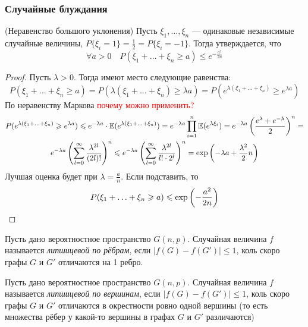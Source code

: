 \subsubsection{Случайные блуждания}

\begin{theorem} (Неравенство большого уклонения)
	Пусть $\xi_1, \ldots, \xi_n$ --- одинаковые независимые случайные величины, $P\{\xi_i = 1\} = \frac{1}{2} = P\{\xi_i = -1\}$. Тогда утверждается, что
	\[
		\forall a > 0 \quad P(\xi_1 + \ldots + \xi_n \ge a) \le e^{-\frac{a^2}{2n}}
	\]
\end{theorem}

\begin{proof}
	Пусть $\lambda > 0$. Тогда имеют место следующие равенства:
	\[
		P(\xi_1 + \ldots + \xi_n \ge a) = P(\lambda(\xi_1 + \ldots + \xi_n) \ge \lambda a) = P(e^{\lambda (\xi_1 + \ldots + \xi_n)} \ge e^{\lambda a})
	\]
	По неравенству Маркова \textcolor{red}{почему можно применить?}
	\begin{multline*}
		P(e^{\lambda (\xi_1 + \ldots + \xi_n)} \geqslant e^{\lambda a}) \leqslant e^{-\lambda a} \cdot \mathbb{E}(e^{\lambda(\xi_1 + \ldots + \xi_n)}) = e^{-\lambda a} \prod_{i = 1}^n \mathbb{E}(e^{\lambda \xi_i}) = e^{-\lambda a} \left(\frac{e^\lambda + e^{-\lambda}}{2}\right)^n =
		\\
		e^{-\lambda a} \left(\sum_{l = 0}^\infty \frac{\lambda^{2l}}{(2l)!}\right)^n \leqslant e^{-\lambda a} \left(\sum_{l = 0}^\infty \frac{\lambda^{2l}}{l! \cdot 2^l}\right)^n = \exp\left(-\lambda a + \frac{\lambda^2}{2}n\right)
	\end{multline*}
	Лучшая оценка будет при $\lambda = \frac{a}{n}$. Если подставить, то
	\[
		P(\xi_1 + \ldots + \xi_n \geqslant a) \leqslant \exp\left(-\frac{a^2}{2n}\right)
	\]
\end{proof}

\begin{definition}
	Пусть дано вероятностное пространство $G(n, p)$. Случайная величина $f$ называется \textit{липшицевой по рёбрам}, если $|f(G) - f(G')| \le 1$, коль скоро графы $G$ и $G'$ отличаются на 1 ребро.
\end{definition}

\begin{definition}
	Пусть дано вероятностное пространство $G(n, p)$. Случайная величина $f$ называется \textit{липшицевой по вершинам}, если $|f(G) - f(G')| \le 1$, коль скоро графы $G$ и $G'$ отличаются в окрестности ровно одной вершины (то есть множества рёбер у какой-то вершины в графах $G$ и $G'$ различаются)
\end{definition}

